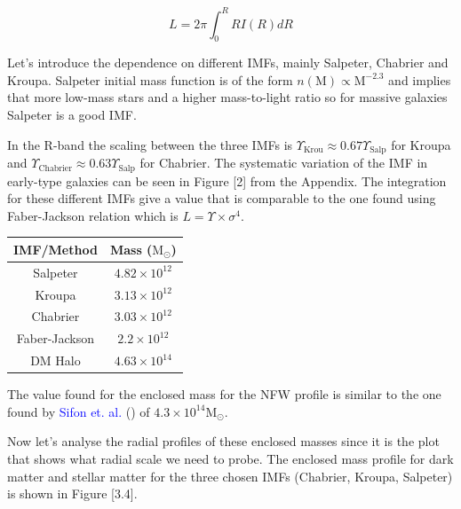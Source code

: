 \begin{equation}
L=2\pi \int_{0}^{R} RI(R)dR
\end{equation}

Let's introduce the dependence on different IMFs, mainly Salpeter, Chabrier and Kroupa. Salpeter initial mass function is of the form $n(\textrm{M})\propto \textrm{M}^{-2.3}$ and implies that more low-mass stars and a higher mass-to-light ratio so for massive galaxies  Salpeter is a good IMF. 

In the R-band the scaling between the three IMFs is $\Upsilon_{\text{Krou}}\approx 0.67\Upsilon_{\text{Salp}}$ for Kroupa and $\Upsilon_{\text{Chabrier}}\approx 0.63\Upsilon_{\text{Salp}}$ for Chabrier. The systematic variation of the IMF in early-type galaxies can be seen in Figure [2] from the Appendix. The integration for these different IMFs give a value that is comparable to the one found using Faber-Jackson relation which is $L=\Upsilon\times\sigma^{4}$. 

\begin{center}
\begin{tabular}{c c}
IMF/Method & Mass ($\text{M}_{\odot}$)\tabularnewline
\hline 
\hline
Salpeter & $4.82\times10^{12}$\tabularnewline
Kroupa & $3.13\times10^{12}$\tabularnewline
Chabrier & $3.03\times10^{12}$\tabularnewline
Faber-Jackson & $2.2\times10^{12}$\tabularnewline
DM Halo & $4.63\times10^{14}$\tabularnewline
\end{tabular}
\end{center}

The value found for the enclosed mass for the NFW profile is similar to the one found by \textcolor{blue}{Sifon et. al.} (\citeyear{Reference9}) of $4.3\times 10^{14}\text{M}_{\odot}$.

Now let's analyse the radial profiles of these enclosed masses since it is the plot that shows what radial scale we need to probe. The enclosed mass profile for dark matter and stellar matter for the three chosen IMFs (Chabrier, Kroupa, Salpeter) is shown in Figure [3.4].

